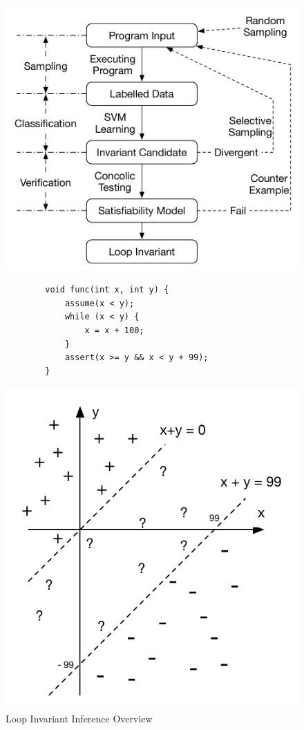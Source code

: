 \begin{figure}[t]
    \centering
    \begin{minipage}{.5\textwidth}
        \centering
        \includegraphics[scale=0.4]{figures/overview.pdf}
        \caption{Loop Invariant Inference Overview}
        \label{fig:overview}
    \end{minipage}%
    \begin{minipage}{.5\textwidth}
        \centering
        {\scriptsize\begin{verbatim}
        void func(int x, int y) {
            assume(x < y);
            while (x < y) {
                x = x + 100;
            }
            assert(x >= y && x < y + 99);
        }\end{verbatim}}
        \includegraphics[scale=0.35]{figures/running-sampling.pdf}

\end{minipage}
\end{figure}
